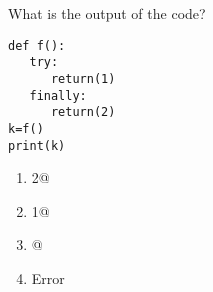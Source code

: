 \question
What is the output of the code?

\begin{lstlisting}
def f():
   try:
      return(1)
   finally:
      return(2)
k=f()
print(k)
\end{lstlisting}
\begin{enumerate}
\item {} 2@
\item {} 1@
\item {}@
\item Error
\end{enumerate}


